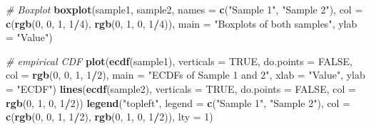 \documentclass[
]{article}
\newenvironment{Shaded}{\begin{snugshade}}{\end{snugshade}}
\newcommand{\AttributeTok}[1]{\textcolor[rgb]{0.13,0.29,0.53}{#1}}
\newcommand{\CommentTok}[1]{\textcolor[rgb]{0.56,0.35,0.01}{\textit{#1}}}
\newcommand{\ConstantTok}[1]{\textcolor[rgb]{0.56,0.35,0.01}{#1}}
\newcommand{\DecValTok}[1]{\textcolor[rgb]{0.00,0.00,0.81}{#1}}
\newcommand{\FunctionTok}[1]{\textcolor[rgb]{0.13,0.29,0.53}{\textbf{#1}}}
\newcommand{\NormalTok}[1]{#1}
\newcommand{\SpecialCharTok}[1]{\textcolor[rgb]{0.81,0.36,0.00}{\textbf{#1}}}
\newcommand{\StringTok}[1]{\textcolor[rgb]{0.31,0.60,0.02}{#1}}
\begin{document}
\begin{Shaded}
\begin{Highlighting}[]
\CommentTok{\# Boxplot}
\FunctionTok{boxplot}\NormalTok{(sample1, sample2, }\AttributeTok{names =} \FunctionTok{c}\NormalTok{(}\StringTok{"Sample 1"}\NormalTok{, }\StringTok{"Sample 2"}\NormalTok{), }\AttributeTok{col =} \FunctionTok{c}\NormalTok{(}\FunctionTok{rgb}\NormalTok{(}\DecValTok{0}\NormalTok{, }\DecValTok{0}\NormalTok{, }\DecValTok{1}\NormalTok{, }\DecValTok{1}\SpecialCharTok{/}\DecValTok{4}\NormalTok{), }\FunctionTok{rgb}\NormalTok{(}\DecValTok{0}\NormalTok{, }\DecValTok{1}\NormalTok{, }\DecValTok{0}\NormalTok{,  }\DecValTok{1}\SpecialCharTok{/}\DecValTok{4}\NormalTok{)),}
        \AttributeTok{main =} \StringTok{"Boxplots of both samples"}\NormalTok{, }\AttributeTok{ylab =} \StringTok{"Value"}\NormalTok{)}


\CommentTok{\# empirical CDF}
\FunctionTok{plot}\NormalTok{(}\FunctionTok{ecdf}\NormalTok{(sample1), }\AttributeTok{verticals =} \ConstantTok{TRUE}\NormalTok{, }\AttributeTok{do.points =} \ConstantTok{FALSE}\NormalTok{, }\AttributeTok{col =} \FunctionTok{rgb}\NormalTok{(}\DecValTok{0}\NormalTok{, }\DecValTok{0}\NormalTok{, }\DecValTok{1}\NormalTok{, }\DecValTok{1}\SpecialCharTok{/}\DecValTok{2}\NormalTok{),}
     \AttributeTok{main =} \StringTok{"ECDFs of Sample 1 and 2"}\NormalTok{, }\AttributeTok{xlab =} \StringTok{"Value"}\NormalTok{, }\AttributeTok{ylab =} \StringTok{"ECDF"}\NormalTok{)}
\FunctionTok{lines}\NormalTok{(}\FunctionTok{ecdf}\NormalTok{(sample2), }\AttributeTok{verticals =} \ConstantTok{TRUE}\NormalTok{, }\AttributeTok{do.points =} \ConstantTok{FALSE}\NormalTok{, }\AttributeTok{col =} \FunctionTok{rgb}\NormalTok{(}\DecValTok{0}\NormalTok{, }\DecValTok{1}\NormalTok{, }\DecValTok{0}\NormalTok{, }\DecValTok{1}\SpecialCharTok{/}\DecValTok{2}\NormalTok{))}
\FunctionTok{legend}\NormalTok{(}\StringTok{"topleft"}\NormalTok{, }\AttributeTok{legend =} \FunctionTok{c}\NormalTok{(}\StringTok{"Sample 1"}\NormalTok{, }\StringTok{"Sample 2"}\NormalTok{), }\AttributeTok{col =} \FunctionTok{c}\NormalTok{(}\FunctionTok{rgb}\NormalTok{(}\DecValTok{0}\NormalTok{, }\DecValTok{0}\NormalTok{, }\DecValTok{1}\NormalTok{,  }\DecValTok{1}\SpecialCharTok{/}\DecValTok{2}\NormalTok{), }\FunctionTok{rgb}\NormalTok{(}\DecValTok{0}\NormalTok{, }\DecValTok{1}\NormalTok{, }\DecValTok{0}\NormalTok{,  }\DecValTok{1}\SpecialCharTok{/}\DecValTok{2}\NormalTok{)), }\AttributeTok{lty =} \DecValTok{1}\NormalTok{)}
\end{Highlighting}
\end{Shaded}
\end{document}
